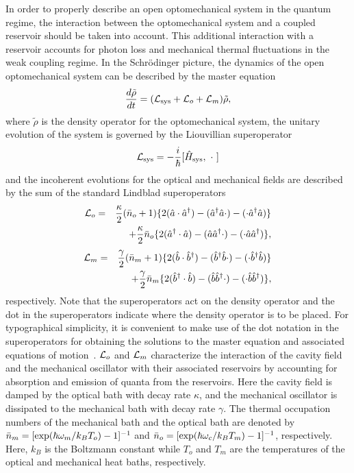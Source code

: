 \documentclass[pra,aps,showpacs,twocolumn,floatfix, superscriptaddress, nofootinbib, nobibnotes]{revtex4-1}
\begin{document}
In order to properly describe an open optomechanical system in the quantum regime, the interaction between the optomechanical system and a coupled reservoir should be taken into account. This additional interaction with a reservoir accounts for photon loss and mechanical thermal fluctuations in the weak coupling regime. In the Schr{\"o}dinger picture, the dynamics of the open optomechanical system can be described by the master equation~\cite{Pierre_book}
\begin{equation}
\frac{d\tilde\rho}{dt} =({\cal L}_{\rm sys}+{\cal L}_o +{\cal L}_m)\tilde\rho, 
\end{equation}
where  $\tilde\rho$ is the density operator for the optomechanical system, the unitary evolution of the system is governed by the Liouvillian superoperator
\begin{equation}
 {\cal L}_{\rm sys} = -\frac{i}{\hbar}[\hat H_{\rm sys},~\cdot~]
\end{equation}
and the incoherent evolutions for the optical and mechanical fields are described by the sum of the standard Lindblad superoperators 
\begin{eqnarray}
{\cal L}_o &=&\frac{\kappa}{2}(\bar n_o+1)\{2(\hat a \cdot \hat a^{\dag})-(\hat a^\dag \hat a  \cdot)- (\cdot\hat a^\dag \hat a)\} \nonumber \\
&&+\frac{\kappa}{2}\bar n_o\{2(\hat a^{\dag} \cdot \hat a)-(\hat a \hat a^\dag  \cdot)- (\cdot\hat a \hat a^\dag)\},
\end{eqnarray}
\begin{eqnarray}
{\cal L}_m &=&\frac{\gamma}{2}(\bar n_m+1)\{2(\hat b \cdot \hat b^{\dag})-(\hat b^\dag \hat b  \cdot)- (\cdot\hat b^\dag \hat b)\} \nonumber \\
&&+\frac{\gamma}{2}\bar n_m\{2(\hat b^{\dag} \cdot \hat b)-(\hat b \hat b^\dag  \cdot)- (\cdot\hat b \hat b^\dag)\},
\end{eqnarray}
respectively. Note that the superoperators act on the density operator and the dot in the superoperators indicate where the density operator is to be placed. For typographical simplicity, it is convenient to make use of the dot notation in the superoperators for obtaining the solutions to the master equation and associated equations of motion~\cite{Carmichael_book_1}. ${\cal L}_o$ and ${\cal L}_m$ characterize the interaction of the cavity field and the mechanical oscillator with their associated reservoirs by accounting for absorption and emission of quanta from the reservoirs. Here the cavity field is damped by the optical bath with decay rate $\kappa$, and the mechanical oscillator is dissipated to the mechanical bath with decay rate $\gamma$. The thermal occupation numbers of the mechanical bath and the optical bath are denoted by ${\bar n}_m=[{\rm exp}(\hbar\omega_m/k_BT_o)-1]^{-1}$ and ${\bar n}_o=[{\rm exp}(\hbar\omega_c/k_BT_m)-1]^{-1}$, respectively. Here, $k_B$ is the Boltzmann constant while $T_o$ and $T_m$ are the temperatures of the optical and mechanical heat baths, respectively.
\end{document}
